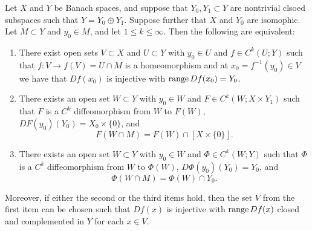 \documentclass[a4paper]{article}
\begin{document}
\begin{thm}
  Let $X$ and $Y$ be Banach spaces, and suppose that
  $Y_0, Y_1 \subset Y$ are nontrivial clsoed subspaces
  such that $Y = Y_0 \oplus Y_1$. Suppose further that
  $X$ and $Y_0$ are isomophic. Let $M \subset Y$ and
  $y_0 \in M$, and let $1 \leq k \leq \infty$. Then the
  following are equivalent:
  \begin{enumerate}
    \item There exist open sets $V \subset X$ and $U \subset Y$ with $y_0
          \in U$ and $f \in C^k(U ; Y)$ such that $f : V \to f(V) = U \cap
          M$ is a homeomorphism and at $x_0 = f^{-1}(y_0) \in V$ we have
          that $Df(x_0)$ is injective with $\operatorname{range} Df(x_0) = Y_0$.

    \item There exists an open set $W \subset Y$ with $y_0 \in W$ and $F
          \in C^k(W ; X \times Y_1)$ such that $F$ is a $C^k$
          diffeomorphism from $W$ to $F(W)$, $DF(y_0)(Y_0) = X_0 \times
          \{0\}$, and
          \[
            F(W \cap M) = F(W) \cap [X \times \{0\}].
          \]

    \item There exists an open set $W \subset Y$ with $y_0 \in W$ and
          $\Phi \in C^k(W ; Y)$ such that $\Phi$ is a $C^k$ diffeomorphism
          from $W$ to $\Phi(W)$, $D \Phi(y_0) (Y_0) = Y_0$, and
          \[
            \Phi(W \cap M) = \Phi(W) \cap Y_0.
          \]
  \end{enumerate}

  Moreover, if either the second or the third items hold, then the set $V$
  from the first item can be chosen such that $Df(x)$ is injective with
  $\operatorname{range} Df(x)$ closed and complemented in $Y$ for each $x \in V$.
\end{thm}
\end{document}
